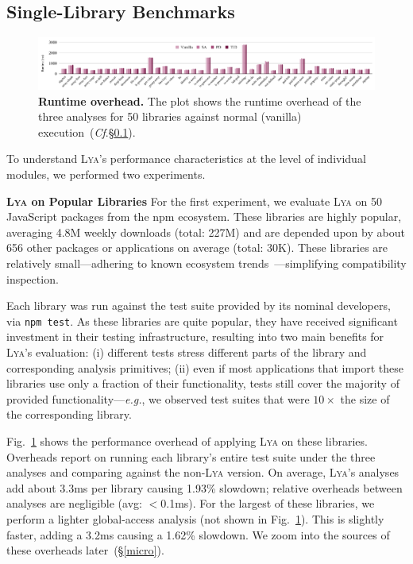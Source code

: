 \documentclass[letterpaper,twocolumn,10pt]{article}
\def\eg{{\em e.g.}, }
\newcommand{\heading}[1]{\vspace{2pt}\noindent\textbf{#1}\enspace}
\newcommand{\ttt}[1]{\texttt{#1}}
\newcommand{\cf}[1]{(\emph{Cf}.\S\ref{#1})}
\newcommand{\sx}[1]{(\S\ref{#1})}
\newcommand{\sys}{{\scshape Lya}\xspace}
\begin{document}
\subsection{Single-Library Benchmarks}
\label{meso}

\begin{figure}[t]
  \centering
   \includegraphics[width=\textwidth]{./figs/micro-packages.pdf}
  \caption{
    \textbf{Runtime overhead.}
    The plot shows the runtime overhead of the three analyses for 50 libraries against normal (vanilla) execution~\cf{meso}.
  }
  \label{fig:micro-packages}
  \vspace{-3mm}
\end{figure}

To understand \sys's performance characteristics at the level of individual modules, we performed two experiments.

\heading{\sys on Popular Libraries}
For the first experiment, we evaluate \sys on 50 JavaScript packages from the npm ecosystem.
These libraries are highly popular, averaging 4.8M weekly downloads (total: 227M) and are depended upon by about 656 other packages or applications on average (total: 30K).
These libraries are relatively small---adhering to known ecosystem trends~\cite{npmstudy:19}---simplifying compatibility inspection.

Each library was run against the test suite provided by its nominal developers, via \ttt{npm test}.
As these libraries are quite popular, they have received significant investment in their testing infrastructure, resulting into two main benefits for \sys's evaluation:
  (i) different tests stress different parts of the library and corresponding analysis primitives;
  (ii) even if most applications that import these libraries use only a fraction of their functionality, tests still cover the majority of provided functionality---\eg we observed test suites that were $10\times$ the size of the corresponding library.  

Fig.~\ref{fig:micro-packages} shows the performance overhead of applying \sys on these libraries.
Overheads report on running each library's entire test suite under the three analyses and comparing against the non-\sys version.
On average, \sys's analyses add about 3.3ms per library causing 1.93\% slowdown;
  relative overheads between analyses are negligible (avg: $<$0.1ms).
For the largest of these libraries, we perform a lighter global-access analysis (not shown in Fig.~\ref{fig:micro-packages}).
This is slightly faster, adding a 3.2ms causing a 1.62\% slowdown.
We zoom into the sources of these overheads later~\sx{micro}.
\end{document}
